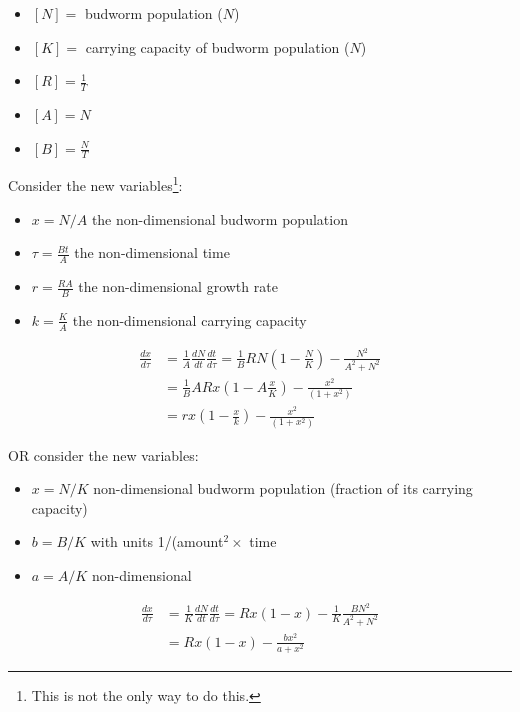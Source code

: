 \documentclass{workbook}
\begin{document}
\begin{solution}
\begin{slide}

\begin{parts}
	\item \begin{itemize}
		\item $[N] =$ budworm population ($N$)
		\item $[K] =$  carrying capacity of budworm population ($N$)
		\item $[R] =\frac{1}{T}$ 
		\item $[A] = N$
		\item $[B] = \frac{N}{T}$
 	\end{itemize}
 	
 	\item Consider the new variables\footnote{This is not the only way to do this.}:
		\begin{itemize}
			\item $x = N/A$ the non-dimensional budworm population
			\item $\tau = \frac{Bt}{A}$ the non-dimensional time
			\item $r = \frac{RA}{B}$ the non-dimensional growth rate
			\item $k = \frac{K}{A}$ the non-dimensional carrying capacity
		\end{itemize}


	\begin{align*}
		\frac{dx}{d\tau} 
			& = \frac{1}{A} \frac{dN}{dt} \frac{dt}{d\tau}
			= \frac{1}{B} R N \left( 1 - \frac{N}{K} \right) - \frac{N^2}{A^2 + N^2} \\
			& = \frac{1}{B} A R x \left( 1 - A\frac{x}{K} \right) - \frac{x^2}{(1 + x^2)} \\
			& = r x \left(1-\frac{x}{k}\right)- \frac{x^2}{(1 + x^2)}
	\end{align*}


	OR consider the new variables:
	\begin{itemize}
		\item $x = N/K$ non-dimensional budworm population (fraction of its carrying capacity)
		\item $b = B/K$ with units 1/(amount$^2 \times$ time
		\item $a = A/K$ non-dimensional
	\end{itemize}
	
	\begin{align*}
		\frac{dx}{d\tau} 
			& = \frac{1}{K} \frac{dN}{dt} \frac{dt}{d\tau}
			= R x \left( 1 - x \right) - \frac{1}{K}\frac{B N^2}{A^2 + N^2} \\
			& = R x \left( 1 - x \right) - \frac{b x^2}{a + x^2}
	\end{align*}


	
\end{parts}	
	
\end{slide}

\end{solution}	
\end{document}

